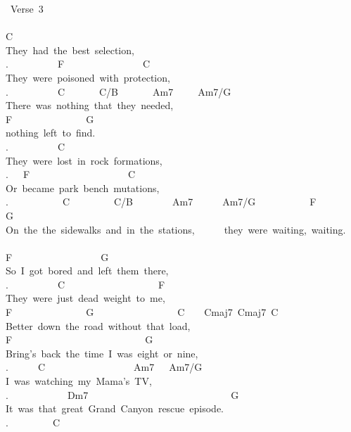 {\lbrack\ Verse\ 3\rbrack\\
\\
C\\
They\ had\ the\ best\ selection,\\
.\ \ \ \ \ \ \ \ \ \ F\ \ \ \ \ \ \ \ \ \ \ \ \ \ \ \ C\\
They\ were\ poisoned\ with\ protection,\\
.\ \ \ \ \ \ \ \ \ \ C\ \ \ \ \ \ \ C/B\ \ \ \ \ \ \ Am7\ \ \ \ \ Am7/G\\
There\ was\ nothing\ that\ they\ needed,\ \\
F\ \ \ \ \ \ \ \ \ \ \ \ \ \ \ G\ \\
nothing\ left\ to\ find.\\
.\ \ \ \ \ \ \ \ \ \ C\\
They\ were\ lost\ in\ rock\ formations,\\
.\ \ \ F\ \ \ \ \ \ \ \ \ \ \ \ \ \ \ \ \ \ \ \ C\ \\
Or\ became\ park\ bench\ mutations,\\
.\ \ \ \ \ \ \ \ \ \ \ C\ \ \ \ \ \ \ \ \ C/B\ \ \ \ \ \ \ \ Am7\ \ \ \ \ \ Am7/G\ \ \ \ \ \ \ \ \ \ \ F\ \ \ \ \ \ \ \ G\\
On\ the\ the\ sidewalks\ and\ in\ the\ stations,\ \ \ \ \ \ they\ were\ waiting,\ waiting.\\
\\
F\ \ \ \ \ \ \ \ \ \ \ \ \ \ \ \ \ \ G\\
So\ I\ got\ bored\ and\ left\ them\ there,\\
.\ \ \ \ \ \ \ \ \ \ C\ \ \ \ \ \ \ \ \ \ \ \ \ \ \ \ \ \ \ F\\
They\ were\ just\ dead\ weight\ to\ me,\\
F\ \ \ \ \ \ \ \ \ \ \ \ \ \ \ G\ \ \ \ \ \ \ \ \ \ \ \ \ \ \ \ \ C\ \ \ \ Cmaj7\ Cmaj7\ C\ \ \\
Better\ down\ the\ road\ without\ that\ load,\\
F\ \ \ \ \ \ \ \ \ \ \ \ \ \ \ \ \ \ \ \ \ \ \ \ \ \ \ G\\
Bring's\ back\ the\ time\ I\ was\ eight\ or\ nine,\\
.\ \ \ \ \ \ C\ \ \ \ \ \ \ \ \ \ \ \ \ \ \ \ \ \ Am7\ \ \ Am7/G\ \\
I\ was\ watching\ my\ Mama's\ TV,\\
.\ \ \ \ \ \ \ \ \ \ \ \ Dm7\ \ \ \ \ \ \ \ \ \ \ \ \ \ \ \ \ \ \ \ \ \ \ \ \ \ \ \ \ G\ \ \ \ \\
It\ was\ that\ great\ Grand\ Canyon\ rescue\ episode.\\
.\ \ \ \ \ \ \ \ \ C\\
}
